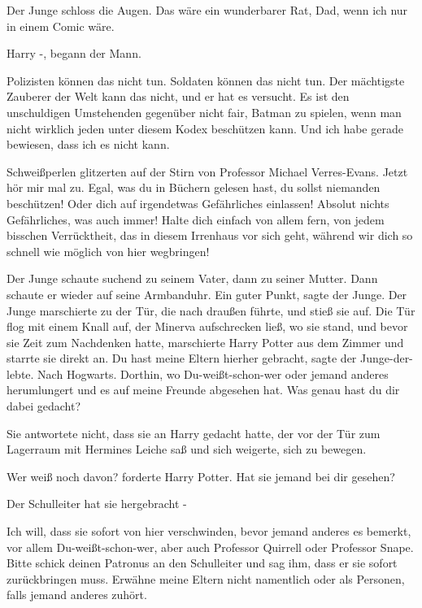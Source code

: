 Der Junge schloss die Augen. \glqq Das wäre ein wunderbarer Rat, Dad, wenn ich
nur in einem Comic wäre.\grqq{}

\glqq Harry -\grqq{}, begann der Mann.

\glqq Polizisten können das nicht tun. Soldaten können das nicht tun. Der
mächtigste Zauberer der Welt kann das nicht, und er hat es versucht. Es ist den
unschuldigen Umstehenden gegenüber nicht fair, Batman zu spielen, wenn man nicht
wirklich jeden unter diesem Kodex beschützen kann. Und ich habe gerade bewiesen,
dass ich es nicht kann.\grqq{}

Schweißperlen glitzerten auf der Stirn von Professor Michael Verres-Evans. \glqq
Jetzt hör mir mal zu. Egal, was du in Büchern gelesen hast, du sollst niemanden
beschützen! Oder dich auf irgendetwas Gefährliches einlassen! Absolut nichts
Gefährliches, was auch immer! Halte dich einfach von allem fern, von jedem
bisschen Verrücktheit, das in diesem Irrenhaus vor sich geht, während wir dich
so schnell wie möglich von hier wegbringen!\grqq{}

Der Junge schaute suchend zu seinem Vater, dann zu seiner Mutter. Dann schaute
er wieder auf seine Armbanduhr. \glqq Ein guter Punkt\grqq{}, sagte der Junge.
Der Junge marschierte zu der Tür, die nach draußen führte, und stieß sie auf.
Die Tür flog mit einem Knall auf, der Minerva aufschrecken ließ, wo sie stand,
und bevor sie Zeit zum Nachdenken hatte, marschierte Harry Potter aus dem Zimmer
und starrte sie direkt an. \glqq Du hast meine Eltern hierher gebracht\grqq{},
sagte der Junge-der-lebte. \glqq Nach Hogwarts. Dorthin, wo Du-weißt-schon-wer
oder jemand anderes herumlungert und es auf meine Freunde abgesehen hat. Was
genau hast du dir dabei gedacht?\grqq{}

Sie antwortete nicht, dass sie an Harry gedacht hatte, der vor der Tür zum
Lagerraum mit Hermines Leiche saß und sich weigerte, sich zu bewegen.

\glqq Wer weiß noch davon?\grqq{} forderte Harry Potter. \glqq Hat sie jemand
bei dir gesehen?\grqq{}

\glqq Der Schulleiter hat sie hergebracht -\grqq{}

\glqq Ich will, dass sie sofort von hier verschwinden, bevor jemand anderes es
bemerkt, vor allem Du-weißt-schon-wer, aber auch Professor Quirrell oder
Professor Snape. Bitte schick deinen Patronus an den Schulleiter und sag ihm,
dass er sie sofort zurückbringen muss. Erwähne meine Eltern nicht namentlich
oder als Personen, falls jemand anderes zuhört.\grqq{}

